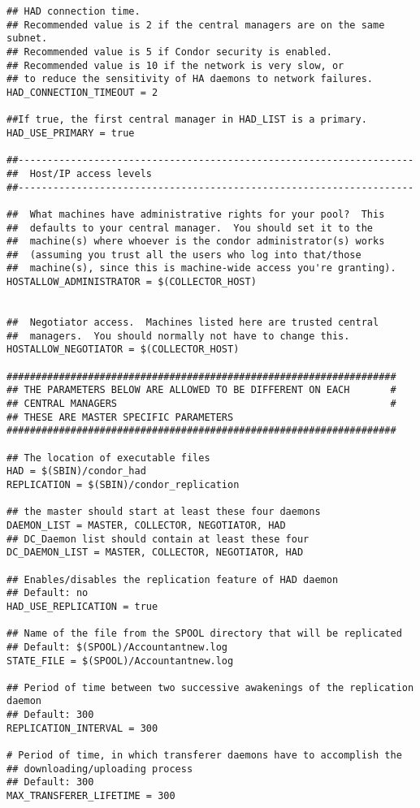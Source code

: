 \begin{verbatim}
## HAD connection time.
## Recommended value is 2 if the central managers are on the same subnet.
## Recommended value is 5 if Condor security is enabled.
## Recommended value is 10 if the network is very slow, or
## to reduce the sensitivity of HA daemons to network failures.
HAD_CONNECTION_TIMEOUT = 2

##If true, the first central manager in HAD_LIST is a primary.
HAD_USE_PRIMARY = true

##--------------------------------------------------------------------
##  Host/IP access levels
##--------------------------------------------------------------------

##  What machines have administrative rights for your pool?  This
##  defaults to your central manager.  You should set it to the
##  machine(s) where whoever is the condor administrator(s) works
##  (assuming you trust all the users who log into that/those
##  machine(s), since this is machine-wide access you're granting).
HOSTALLOW_ADMINISTRATOR = $(COLLECTOR_HOST) 


##  Negotiator access.  Machines listed here are trusted central
##  managers.  You should normally not have to change this.
HOSTALLOW_NEGOTIATOR = $(COLLECTOR_HOST)

###################################################################
## THE PARAMETERS BELOW ARE ALLOWED TO BE DIFFERENT ON EACH       #
## CENTRAL MANAGERS                                               #
## THESE ARE MASTER SPECIFIC PARAMETERS
###################################################################

## The location of executable files
HAD = $(SBIN)/condor_had
REPLICATION = $(SBIN)/condor_replication

## the master should start at least these four daemons
DAEMON_LIST = MASTER, COLLECTOR, NEGOTIATOR, HAD
## DC_Daemon list should contain at least these four
DC_DAEMON_LIST = MASTER, COLLECTOR, NEGOTIATOR, HAD

## Enables/disables the replication feature of HAD daemon
## Default: no
HAD_USE_REPLICATION = true

## Name of the file from the SPOOL directory that will be replicated
## Default: $(SPOOL)/Accountantnew.log
STATE_FILE = $(SPOOL)/Accountantnew.log

## Period of time between two successive awakenings of the replication daemon
## Default: 300
REPLICATION_INTERVAL = 300

# Period of time, in which transferer daemons have to accomplish the 
## downloading/uploading process
## Default: 300
MAX_TRANSFERER_LIFETIME = 300


\end{verbatim}
